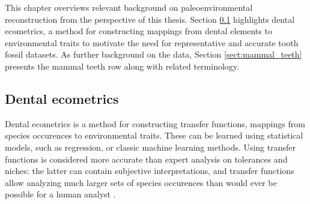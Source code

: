 \documentclass{article}
\begin{document}
This chapter overviews relevant background on paleoenvironmental reconstruction from the perspective of this thesis.
Section \ref{sect:ecometrics} highlights dental ecometrics, a method for constructing mappings from dental elements to environmental traits to motivate the 
need for representative and accurate tooth fossil datasets. As further background on the data, Section \ref{sect:mammal_teeth} presents the mammal teeth 
row along with related terminology.

\subsection{Dental ecometrics}
\label{sect:ecometrics}

Dental ecometrics is a method for constructing transfer functions, mappings from species occurences to environmental traits.
These can be learned using statistical models, such as regression, or classic machine learning methods.
Using transfer functions is considered more accurate than expert analysis on tolerances and niches: the latter
can contain subjective interpretations, and transfer functions allow analyzing much larger sets of species occurences than would 
ever be possible for a human analyst \cite{Faith_Lyman_2019}.
\end{document}
